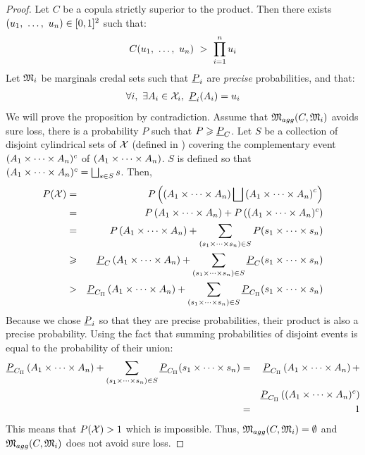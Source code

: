 \begin{proof}
    Let $C$ be a copula strictly superior to the product. Then there exists $(u_1 , ~\ldots, ~ u_n)\in[0,1]^2$ such that:
    \begin{eqnarray*}
        C(u_1 , ~\ldots, ~  u_n)~>~\prod_{i=1}^n u_i
    \end{eqnarray*}
    Let $\mathfrak{M}_i$ be marginals credal sets such that $\underline{P}_i$ are \textit{precise} probabilities, and that:
    \begin{eqnarray*}
        \forall i,~\exists A_i\in\mathcal{X}_i,~\underline{P}_i(A_i)=u_i
    \end{eqnarray*}
    We will prove the proposition by contradiction. Assume that $\mathfrak{M}_{agg}(C, \mathfrak{M}_i)$ avoids sure loss, \ie there is a probability $P$ such that $P\geqslant\underline{P}_C$.  Let $S$ be a collection of disjoint cylindrical sets of $\mathcal{X}$ (defined in ) covering the complementary event $(A_1\times\dots\times A_n)^c$ of $(A_1\times\dots\times A_n)$. $S$ is defined so that $(A_1\times\dots\times A_n)^c=\bigsqcup_{s\in S}s$.
    Then,
    \begin{eqnarray*}
        P(\mathcal{X}) &=& P\left(\left(A_1\times\dots\times A_n\right)\bigsqcup\left(A_1\times\dots\times A_n\right)^c\right)\\
        &=& P\left(A_1\times\dots\times A_n\right)+P\left((A_1\times\dots\times A_n)^c\right)\\
        &=& P\left(A_1\times\dots\times A_n\right)+\sum_{(s_1\times\dots\times s_n)\in S}P(s_1\times\dots\times s_n)\\
        &\geqslant& \underline{P}_C\left(A_1\times\dots\times A_n\right)+\sum_{(s_1\times\dots\times s_n)\in S}\underline{P}_C(s_1\times\dots\times s_n)\\
        &>& \underline{P}_{C_\Pi}\left(A_1\times\dots\times A_n\right)+\sum_{(s_1\times\dots\times s_n)\in S}\underline{P}_{C_\Pi}(s_1\times\dots\times s_n)
    \end{eqnarray*}
    Because we chose $\underline{P}_i$ so that they are precise probabilities, their product is also a precise probability. Using the fact that summing probabilities of disjoint events is equal to the probability of their union:
    \begin{eqnarray*}
        \underline{P}_{C_\Pi}\left(A_1\times\dots\times A_n\right)+\sum_{(s_1\times\dots\times s_n)\in S}\underline{P}_{C_\Pi}(s_1\times\dots\times s_n) &=& \underline{P}_{C_\Pi}\left(A_1\times\dots\times A_n\right)+\\
        &&\underline{P}_{C_\Pi}\left((A_1\times\dots\times A_n)^c\right)\\
        &=& 1
    \end{eqnarray*}
    This means that $P(\mathcal{X})>1$ which is impossible. Thus, $\mathfrak{M}_{agg}(C, \mathfrak{M}_i)=\emptyset$ and $\mathfrak{M}_{agg}(C, \mathfrak{M}_i)$ does not avoid sure loss.
\end{proof}

